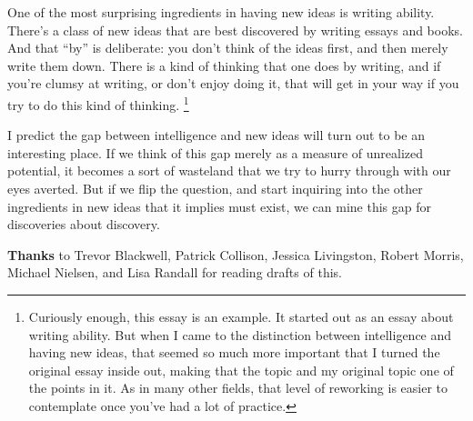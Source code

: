 One of the most surprising ingredients in having new ideas is writing
ability. There's a class of new ideas that are best discovered by
writing essays and books. And that ``by'' is deliberate: you don't think
of the ideas first, and then merely write them down. There is a kind of
thinking that one does by writing, and if you're clumsy at writing, or
don't enjoy doing it, that will get in your way if you try to do this
kind of thinking. \footnote{Curiously enough, this essay is an example. It started out as an
essay about writing ability. But when I came to the distinction between
intelligence and having new ideas, that seemed so much more important
that I turned the original essay inside out, making that the topic and
my original topic one of the points in it. As in many other fields, that
level of reworking is easier to contemplate once you've had a lot of
practice.}

I predict the gap between intelligence and new ideas will turn out to be
an interesting place. If we think of this gap merely as a measure of
unrealized potential, it becomes a sort of wasteland that we try to
hurry through with our eyes averted. But if we flip the question, and
start inquiring into the other ingredients in new ideas that it implies
must exist, we can mine this gap for discoveries about discovery.


\textbf{Thanks} to Trevor Blackwell, Patrick Collison, Jessica
Livingston, Robert Morris, Michael Nielsen, and Lisa Randall for reading
drafts of this.